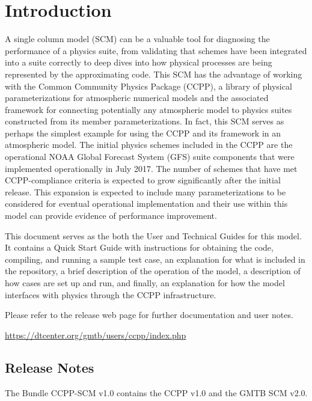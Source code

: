 \chapter{Introduction}
\label{chapter: introduction}
\setlength{\parskip}{12pt}

A single column model (SCM) can be a valuable tool for diagnosing the performance of a physics suite, from validating that schemes have been integrated into a suite correctly to deep dives into how physical processes are being represented by the approximating code. This SCM has the advantage of working with the Common Community Physics Package (CCPP), a library of physical parameterizations for atmospheric numerical models and the associated framework for connecting potentially any atmospheric model to physics suites constructed from its member parameterizations. In fact, this SCM serves as perhaps the simplest example for using the CCPP and its framework in an atmospheric model. The initial physics schemes included in the CCPP are the operational NOAA Global Forecast System (GFS) suite components that were implemented operationally in July 2017. The number of schemes that have met CCPP-compliance criteria is expected to grow significantly after the initial release. This expansion is expected to include many parameterizations to be considered for eventual operational implementation and their use within this model can provide evidence of performance improvement.

This document serves as the both the User and Technical Guides for this model. It contains a Quick Start Guide with instructions for obtaining the code, compiling, and running a sample test case, an explanation for what is included in the repository, a brief description of the operation of the model, a description of how cases are set up and run, and finally, an explanation for how the model interfaces with physics through the CCPP infrastructure.

Please refer to the release web page for further documentation and user notes.

\url{https://dtcenter.org/gmtb/users/ccpp/index.php}

\section{Release Notes}

The Bundle CCPP-SCM v1.0 contains the CCPP v1.0 and the GMTB SCM v2.0.

